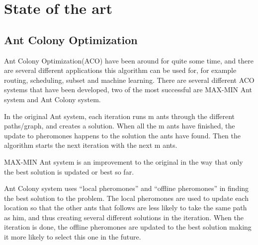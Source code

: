 \chapter{State of the art}
\label{ch:background}

\section{Ant Colony Optimization}

Ant Colony Optimization(ACO) have been around for quite some time, and there are several different applications this algorithm can be used for, for example routing, scheduling, subset and machine learning. There are several different ACO systems that have been developed, two of the most successful are MAX-MIN Ant system and Ant Colony system.

In the original Ant system, each iteration runs m ants through the different paths/graph, and creates a solution. When all the m ants have finished, the update to pheromones happens to the solution the ants have found. Then the algorithm starts the next iteration with the next m ants.

MAX-MIN Ant system is an improvement to the original in the way that only the best solution is updated or best so far.

Ant Colony system uses “local pheromones” and “offline pheromones” in finding the best solution to the problem. The local pheromones are used to update each location so that the other ants that follows are less likely to take the same path as him, and thus creating several different solutions in the iteration. When the iteration is done, the offline pheromones are updated to the best solution making it more likely to select this one in the future.


